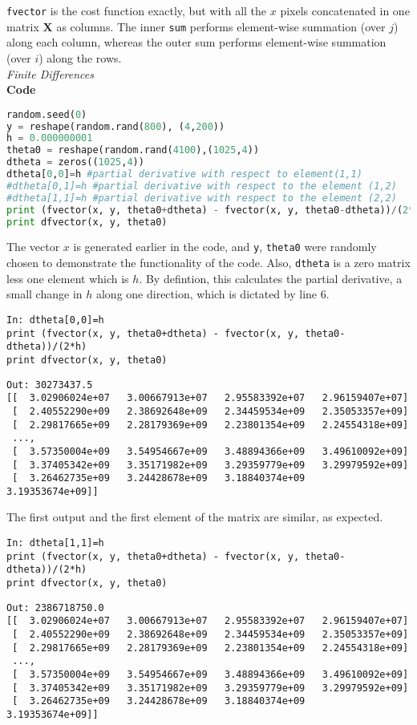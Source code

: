 \documentclass{article}
\begin{document}
\verb|fvector| is the cost function exactly, but with all the $x$ pixels concatenated in one matrix $\mathbf{X}$ as columns. The inner \verb|sum| performs element-wise summation (over $j$) along each column, whereas the outer sum performs element-wise summation (over $i$) along the rows. \\ 


\noindent \textit{Finite Differences} 
\\
\textbf{Code}
\begin{lstlisting}[language=Python]
random.seed(0)
y = reshape(random.rand(800), (4,200))
h = 0.000000001
theta0 = reshape(random.rand(4100),(1025,4))
dtheta = zeros((1025,4))
dtheta[0,0]=h #partial derivative with respect to element(1,1)
#dtheta[0,1]=h #partial derivative with respect to the element (1,2)
#dtheta[1,1]=h #partial derivative with respect to the element (2,2)
print (fvector(x, y, theta0+dtheta) - fvector(x, y, theta0-dtheta))/(2*h)
print dfvector(x, y, theta0)
\end{lstlisting}

The vector $x$ is generated earlier in the code, and \verb|y|, \verb|theta0| were randomly chosen to demonstrate the functionality of the code. Also, \verb|dtheta| is a zero matrix less one element which is $h$. By defintion, this calculates the partial derivative, a small change in $h$ along one direction, which is dictated by line 6.\\

\begin{verbatim}
In: dtheta[0,0]=h
print (fvector(x, y, theta0+dtheta) - fvector(x, y, theta0-dtheta))/(2*h)
print dfvector(x, y, theta0)
\end{verbatim}
\begin{verbatim}
Out: 30273437.5
[[  3.02906024e+07   3.00667913e+07   2.95583392e+07   2.96159407e+07]
 [  2.40552290e+09   2.38692648e+09   2.34459534e+09   2.35053357e+09]
 [  2.29817665e+09   2.28179369e+09   2.23801354e+09   2.24554318e+09]
 ..., 
 [  3.57350004e+09   3.54954667e+09   3.48894366e+09   3.49610092e+09]
 [  3.37405342e+09   3.35171982e+09   3.29359779e+09   3.29979592e+09]
 [  3.26462735e+09   3.24428678e+09   3.18840374e+09   3.19353674e+09]]
\end{verbatim}

The first output and the first element of the matrix are similar, as expected. 

\begin{verbatim}
In: dtheta[1,1]=h
print (fvector(x, y, theta0+dtheta) - fvector(x, y, theta0-dtheta))/(2*h)
print dfvector(x, y, theta0)
\end{verbatim}
\begin{verbatim}
Out: 2386718750.0
[[  3.02906024e+07   3.00667913e+07   2.95583392e+07   2.96159407e+07]
 [  2.40552290e+09   2.38692648e+09   2.34459534e+09   2.35053357e+09]
 [  2.29817665e+09   2.28179369e+09   2.23801354e+09   2.24554318e+09]
 ..., 
 [  3.57350004e+09   3.54954667e+09   3.48894366e+09   3.49610092e+09]
 [  3.37405342e+09   3.35171982e+09   3.29359779e+09   3.29979592e+09]
 [  3.26462735e+09   3.24428678e+09   3.18840374e+09   3.19353674e+09]]
\end{verbatim}
\end{document}
